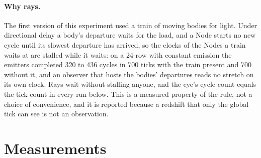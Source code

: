 \documentclass[11pt]{article}
\begin{document}
\paragraph{Why rays.} The first version of this experiment used a train of
moving bodies for light. Under directional delay a body's departure waits
for the load, and a Node starts no new cycle until its slowest departure has
arrived, so the clocks of the Nodes a train waits at are stalled while it
waits: on a 24-row with constant emission the emitters completed 320 to 436
cycles in 700 ticks with the train present and 700 without it, and an
observer that hosts the bodies' departures reads no stretch on its own
clock. Rays wait without stalling anyone, and the eye's cycle count equals
the tick count in every run below. This is a measured property of the rule,
not a choice of convenience, and it is reported because a redshift that only
the global tick can see is not an observation.

\section{Measurements}\label{sec:measure}
\end{document}
